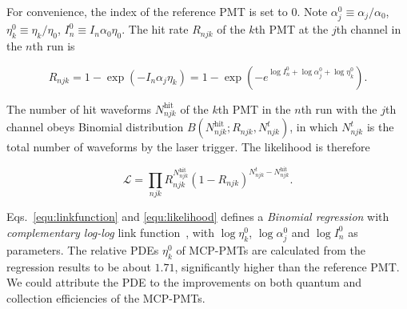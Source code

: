 For convenience, the index of the reference PMT is set to 0. Note $\alpha_j^0\equiv\alpha_j/{\alpha_0}$, $\eta_k^0\equiv\eta_k/{\eta_0}$, $I_n^0\equiv I_n\alpha_0\eta_0$.  The hit rate $R_{njk}$ of the $k$th PMT at the $j$th channel in the $n$th run is

\begin{equation}
    \label{equ:linkfunction}
    R_{njk}=1-\exp\left(-I_n\alpha_j\eta_k\right)=1-\exp\left(-e^{\log{I_n^0}+\log{\alpha_j^0}+\log{\eta_k^0}}\right).
\end{equation}

The number of hit waveforms $N^{\mathrm{hit}}_{njk}$ of the $k$th PMT in the $n$th run with the $j$th channel obeys Binomial distribution $B(N^{\mathrm{hit}}_{njk};R_{njk},N^t_{njk})$, in which $N^t_{njk}$ is the total number of waveforms by the laser trigger. The likelihood is therefore

\begin{equation}
    \label{equ:likelihood}
    \mathcal{L}=\prod_{njk}{R_{njk}^{N^\mathrm{hit}_{njk}}(1-R_{njk})^{N^t_{njk}-N^{\mathrm{hit}}_{njk}}}.
\end{equation}

Eqs.~\eqref{equ:linkfunction} and \eqref{equ:likelihood} defines a \emph{Binomial regression} with \emph{complementary log-log} link function~\cite{glm}, with $\log{\eta_k^0}$, $\log{\alpha_j^0}$ and $\log{I_n^0}$ as parameters. The relative PDEs $\eta_k^0$ of MCP-PMTs are calculated from the regression results to be about $1.71$, significantly higher than the reference PMT.  We could attribute the PDE to the improvements on both quantum and collection efficiencies of the MCP-PMTs. 
